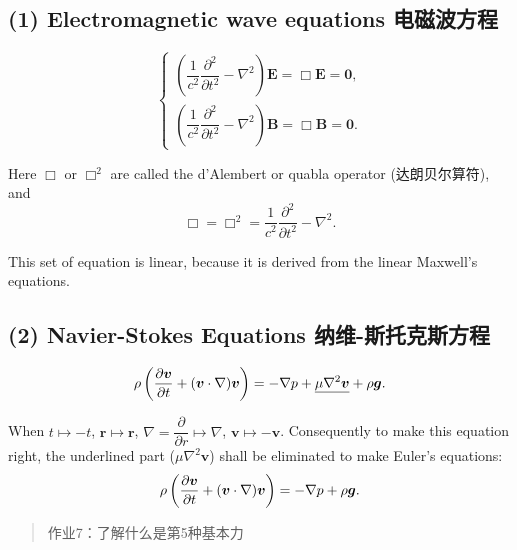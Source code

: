 \subsection*{(1) Electromagnetic wave equations 电磁波方程}\label{electromagnetic-wave-equations-ux7535ux78c1ux6ce2ux65b9ux7a0b}

\[
\left \{
    \begin{array} {l}
        \left(\dfrac{1}{c^2} \dfrac{\partial^2}{\partial t^2}- \nabla^2\right)\boldsymbol E = \Box \boldsymbol{E} = \boldsymbol 0, \\
        \left(\dfrac{1}{c^2} \dfrac{\partial^2}{\partial t^2}- \nabla^2\right)\boldsymbol B = \Box \boldsymbol{B} = \boldsymbol 0. 
    \end{array}
\right.
\]

Here \(\Box\) or \(\Box^2\) are called the d'Alembert or quabla operator (达朗贝尔算符), and \[\Box =\Box^2 = \dfrac{1}{c^2} \dfrac{\partial^2}{\partial t^2}- \nabla^2.\]

This set of equation is linear, because it is derived from the linear Maxwell's equations.

\subsection*{(2) Navier-Stokes Equations 纳维-斯托克斯方程}\label{navier-stokes-equations-ux7eb3ux7ef4-ux65afux6258ux514bux65afux65b9ux7a0b}

\[\rho \left({\partial \boldsymbol v \over \partial t} + (\boldsymbol v \cdot \nabla ) \boldsymbol v \right) = - \nabla p+\underline{\mu\nabla^2\boldsymbol v}+ \rho \boldsymbol g.\]

When \(t \mapsto -t\), \(\boldsymbol r \mapsto \boldsymbol r\), \(\nabla = \dfrac{\partial}{\partial r} \mapsto \nabla\), \(\boldsymbol v \mapsto -\boldsymbol v\). Consequently to make this equation right, the underlined part (\(\mu\nabla^2\boldsymbol v\)) shall be eliminated to make Euler's equations: \[\rho \left({\partial \boldsymbol v \over \partial t} + (\boldsymbol v \cdot \nabla ) \boldsymbol v \right) = - \nabla p+ \rho \boldsymbol g.\]

\begin{quote}
作业7：了解什么是第5种基本力
\end{quote}
